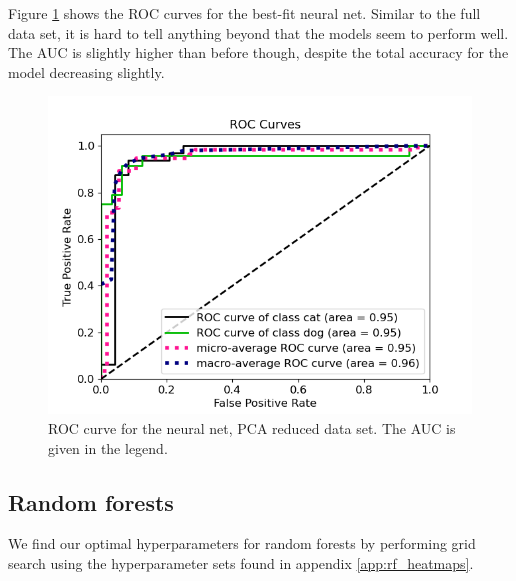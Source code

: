 \documentclass[a4paper]{article}
\begin{document}
Figure \ref{fig:nn_roc_pca} shows the ROC curves for the best-fit neural net. Similar to the full data set, it is hard to tell anything beyond that the models seem to perform well. The AUC is slightly higher than before though, despite the total accuracy for the model decreasing slightly.
\begin{figure}[H]
	\centering
	\includegraphics[scale=0.6]{../figures/neural_net/roc_nbins200_pca35_seed4155_ts0.20.png}
	\caption{ROC curve for the neural net, PCA reduced data set. The AUC is given in the legend.}
	\label{fig:nn_roc_pca}
\end{figure}	

\subsection{Random forests}
We find our optimal hyperparameters for random forests by performing grid search using the hyperparameter sets found in appendix \ref{app:rf_heatmaps}.
\end{document}
